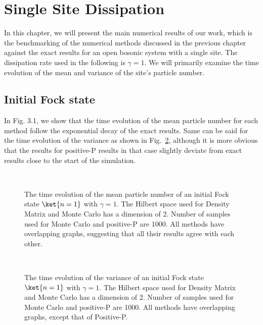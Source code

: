 \section{Single Site Dissipation}

In this chapter, we will present the main numerical results of our work, which is the benchmarking of the numerical methods discussed in the previous chapter against the exact results for an open bosonic system with a single site. The dissipation rate used in the following is $\gamma=1$. We will primarily examine the time evolution of the mean and variance of the site's particle number.


\subsection{Initial Fock state}
\hspace{\parindent} In Fig. 3.1, we show that the time evolution of the mean particle number for each method follow the exponential decay of the exact results. Same can be said for the time evolution of the variance as shown in Fig.~\ref{fig:fockVariance}, although it is more obvious that the results for positive-P results in that case slightly deviate from exact results close to the start of the simulation.

\begin{figure}[h]
  \centering
  \\
  \caption{
  The time evolution of the mean particle number of an initial Fock state $\ket{n=1}$ with $\gamma=1$. The Hilbert space used for Density Matrix and Monte Carlo has a dimension of 2. Number of samples used for Monte Carlo and positive-P are 1000. All methods have overlapping graphs, suggesting that all their results agree with each other.
  }\label{fig:fockMean}
\end{figure}
\begin{figure}[h]
  \centering
  \\
  \caption{
  The time evolution of the variance of an initial Fock state $\ket{n=1}$ with $\gamma=1$. The Hilbert space used for Density Matrix and Monte Carlo has a dimension of 2. Number of samples used for Monte Carlo and positive-P are 1000. All methods have overlapping graphs, except that of Positive-P.
  }\label{fig:fockVariance}
\end{figure}

